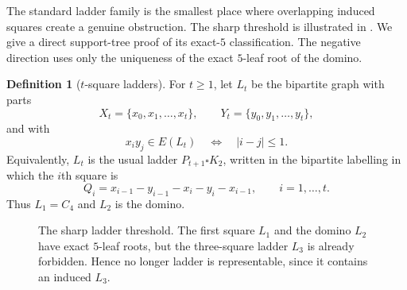 \documentclass[11pt]{article}
\theoremstyle{definition}
\newtheorem{definition}[theorem]{Definition}
\begin{document}
The standard ladder family is the smallest place where overlapping induced squares create a genuine obstruction.  The sharp threshold is illustrated in .  We give a direct support-tree proof of its exact-$5$ classification.  The negative direction uses only the uniqueness of the exact $5$-leaf root of the domino.

\begin{definition}[$t$-square ladders]\label{def:ladder}
For $t\ge1$, let $L_t$ be the bipartite graph with parts
\[
 X_t=\{x_0,x_1,\ldots,x_t\},\qquad
 Y_t=\{y_0,y_1,\ldots,y_t\},
\]
and with
\[
 x_i y_j\in E(L_t)
 \quad\Longleftrightarrow\quad |i-j|\le1.
\]
Equivalently, $L_t$ is the usual ladder $P_{t+1}\square K_2$, written in the bipartite labelling in which the $i$th square is
\[
 Q_i=x_{i-1}-y_{i-1}-x_i-y_i-x_{i-1},
 \qquad i=1,\ldots,t.
\]
Thus $L_1=C_4$ and $L_2$ is the domino.

\end{definition}

\begin{figure}[H]
\centering
{}
\caption{The sharp ladder threshold.  The first square $L_1$ and the domino $L_2$ have exact $5$-leaf roots, but the three-square ladder $L_3$ is already forbidden.  Hence no longer ladder is representable, since it contains an induced $L_3$.}
\label{fig:ladder-threshold}
\end{figure}
\end{document}
